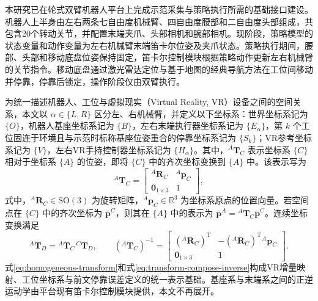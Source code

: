 本研究已在轮式双臂机器人平台上完成示范采集与策略执行所需的基础接口建设。机器人上半身由左右两条七自由度机械臂、四自由度腰部和二自由度头部组成，共包含20个转动关节，并配置末端夹爪、头部相机和腕部相机。现阶段，策略模型的状态变量和动作变量为左右机械臂末端笛卡尔位姿及夹爪状态。策略执行期间，腰部、头部和移动底盘位姿保持固定，笛卡尔控制模块根据策略动作更新左右机械臂的关节指令。移动底盘通过激光雷达定位与基于地图的经典导航方法在工位间移动并停靠，停靠后锁定，操作阶段仅由双臂执行。

为统一描述机器人、工位与虚拟现实（Virtual Reality, VR）设备之间的空间关系，本文以 \(\alpha\in\{L,R\}\) 区分左、右机械臂，并定义以下坐标系：世界坐标系记为 \(\{O\}\)，机器人基座坐标系记为 \(\{B\}\)，左右末端执行器坐标系记为 \(\{E_\alpha\}\)，第 \(k\) 个工位固连于环境且与示范时标称基座位姿重合的停靠坐标系记为 \(\{S_k\}\)；VR参考坐标系记为 \(\{V\}\)，左右VR手持控制器坐标系记为 \(\{H_\alpha\}\)。其中，\({}^{A}\mathbf{T}_{C}\) 表示坐标系 \(\{C\}\) 相对于坐标系 \(\{A\}\) 的位姿，即将 \(\{C\}\) 中的齐次坐标变换到 \(\{A\}\) 中。该表示写为
\begin{equation}
  {}^{A}\mathbf{T}_{C}
  =
  \begin{bmatrix}
    {}^{A}\mathbf{R}_{C} & {}^{A}\mathbf{p}_{C} \\
    \mathbf{0}_{1\times 3} & 1
  \end{bmatrix},
  \label{eq:homogeneous-transform}
\end{equation}
式中，\({}^{A}\mathbf{R}_{C}\in\mathrm{SO}(3)\) 为旋转矩阵，\({}^{A}\mathbf{p}_{C}\in\mathbb{R}^{3}\) 为坐标系原点的位置向量。若空间点在 \(\{C\}\) 中的齐次坐标为 \(\bar{\mathbf p}^{C}\)，则其在 \(\{A\}\) 中的表示为 \(\bar{\mathbf p}^{A}={}^{A}\mathbf T_C\bar{\mathbf p}^{C}\)。连续坐标变换满足
\begin{equation}
  {}^{A}\mathbf{T}_{D}
  =
  {}^{A}\mathbf{T}_{C}\,{}^{C}\mathbf{T}_{D},
  \qquad
  \left({}^{A}\mathbf{T}_{C}\right)^{-1}
  =
  \begin{bmatrix}
    \left({}^{A}\mathbf{R}_{C}\right)^{\mathrm T}
    &
    -\left({}^{A}\mathbf{R}_{C}\right)^{\mathrm T}{}^{A}\mathbf{p}_{C} \\
    \mathbf{0}_{1\times 3} & 1
  \end{bmatrix}.
  \label{eq:transform-compose-inverse}
\end{equation}
式\eqref{eq:homogeneous-transform}和式\eqref{eq:transform-compose-inverse}构成VR增量映射、工位坐标系与前文停靠误差定义的统一表示基础。基座系与末端系之间的正逆运动学由平台现有笛卡尔控制模块提供，本文不再展开。

